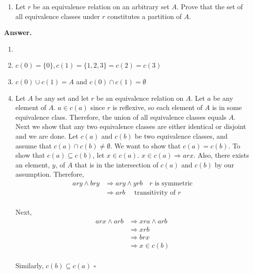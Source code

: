 \documentclass[10pt,]{book}
\theoremstyle{plain}
\theoremstyle{definition}
\theoremstyle{definition}
\theoremstyle{definition}
\theoremstyle{definition}
\begin{document}
\begin{exercisegroup}
\begin{enumerate}[label=\alph*]
\item\hypertarget{li-63}{}Let \(r\) be an equivalence relation on an arbitrary set \(A\). Prove that the set of all equivalence classes under \(r\) constitutes a partition of \(A\).
%
\end{enumerate}
%
\par\smallskip
\par\smallskip
\noindent\textbf{Answer.}\hypertarget{answer-10}{}\quad
\leavevmode%
\begin{enumerate}[label=\alph*]
\item\hypertarget{li-64}{}%
\item\hypertarget{li-65}{} \(c(0)=\{0\}, c(1)=\{1,2,3\}=c(2)=c(3)\)%
\item\hypertarget{li-66}{} \(c(0)\cup c(1)=A\) and \(c(0)\cap c(1)=\emptyset\)%
\item\hypertarget{li-67}{} Let \(A\) be any set and let \(r\) be an equivalence relation on \(A\). Let \(a\) be any element of \(A\). \(a\in c(a)\) since \(r\) is reflexive, so each element of \(A\) is in some equivalence class. Therefore, the union of all equivalence classes equals \(A\). Next we show that any two equivalence classes are either identical or disjoint and we are done. Let \(c(a)\) and \(c(b)\) be two equivalence classes, and assume that \(c(a)\cap c(b)\neq \emptyset\). We want to show that \(c(a)=c(b)\). To show that \(c(a)\subseteq c(b)\), let \(x\in c(a)\). \(x\in c(a) \Rightarrow a r x \). Also, there exists an element, \(y\), of \(A\) that is in the intersection of \(c(a)\)
and \(c(b)\) by our assumption. Therefore,
  \[
  \begin{split}
  a r y \land b r y &\Rightarrow  a r y \land y r b \quad r\textrm{  is symmetric}\\
			&\Rightarrow  a r b  \quad \textrm{ transitivity of }r \\
	\end{split}
	\]%
\par
 Next,
     \begin{equation*}
     \begin{split}
     a r x \land a r b &\Rightarrow x r a \land a r b\\
		&\Rightarrow  x r b\\
		&\Rightarrow  b r x\\
		& \Rightarrow  x \in c(b)\\
		\end{split}
		\end{equation*}
\par
 Similarly, \(c(b)\subseteq c(a)\)  \(\square\) %

\end{enumerate}
\end{exercisegroup}
\end{document}
